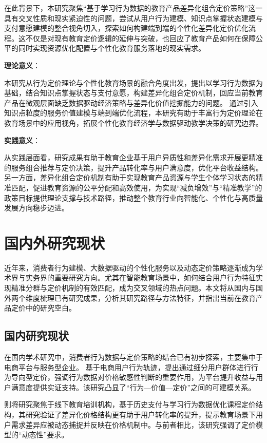 在此背景下，本研究聚焦“基于学习行为数据的教育产品差异化组合定价策略”这一具有交叉性质和现实紧迫性的问题，尝试从用户行为建模、知识点掌握状态建模与支付意愿建模的整合视角切入，探索如何构建端到端的个性化差异化定价优化流程。这不仅是对现有教育定价逻辑的延伸与突破，也回应了教育产品如何在保障公平的同时实现资源优化配置与个性化教育服务落地的现实需求。

\textbf{理论意义}：

本研究从行为定价理论与个性化教育场景的融合角度出发，提出以学习行为数据为基础，结合知识点掌握状态与支付意愿，构建差异化组合定价机制，回应当前教育产品在微观层面缺乏数据驱动经济策略与差异化价值挖掘能力的问题。  
通过引入知识点粒度的服务价值建模与端到端优化流程，本研究有助于丰富行为定价理论在教育场景中的应用视角，拓展个性化教育经济学与数据驱动教学决策的研究边界。

\textbf{实践意义}：

从实践层面看，研究成果有助于教育企业基于用户异质性和差异化需求开展更精准的服务组合推荐与定价决策，提升产品转化率与用户满意度，优化平台收益结构。  
另一方面，差异化组合定价机制有助于实现教育产品资源与学生个体学习状态的精准匹配，促进教育资源的公平分配和高效使用，为实现“减负增效”与“精准教学”的政策目标提供理论支撑与技术路径，推动整个教育行业向智能化、个性化与高质量发展方向稳步迈进。

\section{国内外研究现状}

近年来，消费者行为建模、大数据驱动的个性化服务以及动态定价策略逐渐成为学术界与实务界的重要研究方向。尤其在智能教育场景中，如何结合用户行为特征实现精准分群与定价机制的有效匹配，成为交叉领域的热点问题。本文将从国内与国外两个维度梳理已有研究成果，分析其研究路径与方法特征，并指出当前在教育产品定价中的研究空白。

\subsection{国内研究现状}

在国内学术研究中，消费者行为数据与定价策略的结合已有初步探索，主要集中于电商平台与服务型企业。\cite{li_wei_2023} 基于电商用户行为轨迹，提出通过细分用户群体进行行为导向型定价，强调行为数据对价格敏感性判断的重要作用，为平台提升收益与用户满意度提供实证支持。该研究凸显了“行为—价值—定价”之间的可建模关系。

\cite{zhang2022}则将研究聚焦于线下教育培训机构，基于历史支付与学习行为数据优化课程定价结构，其研究验证了差异化价格结构更有助于用户转化率的提升，提示教育场景下用户需求差异应被动态捕捉并反映在价格机制中。与前者相比，该研究强调了定价模型的“动态性”要求。

